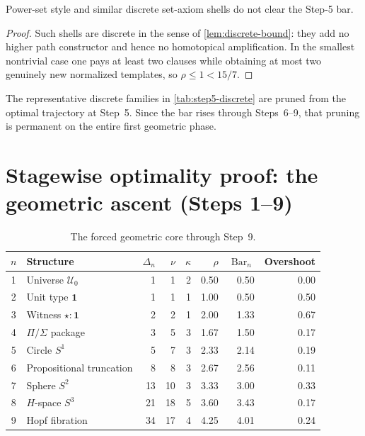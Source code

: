 \documentclass{lmcs}
\newcommand{\U}{\mathcal{U}}
\newcommand{\SelBar}{\operatorname{Bar}}
\begin{document}
\begin{lem}
\label{lem:set-fail}
Power-set style and similar discrete set-axiom shells do not clear the Step-5 bar.
\end{lem}

\begin{proof}
Such shells are discrete in the sense of \autoref{lem:discrete-bound}: they add no higher path constructor and hence no homotopical amplification. In the smallest nontrivial case one pays at least two clauses while obtaining at most two genuinely new normalized templates, so $\rho \leq 1 < 15/7$.
\end{proof}

\begin{cor}
\label{cor:local-pruning}
The representative discrete families in \autoref{tab:step5-discrete} are pruned from the optimal trajectory at Step~5. Since the bar rises through Steps~6--9, that pruning is permanent on the entire first geometric phase.
\end{cor}

\section{Stagewise optimality proof: the geometric ascent (Steps 1--9)}
\label{sec:stagewise}

\begin{table}[tbp]
\centering
\caption{The forced geometric core through Step~9.}
\label{tab:first-nine}
\small
\begin{tabular}{@{}clrrrrrr@{}}
\toprule
$n$ & Structure & $\Delta_n$ & $\nu$ & $\kappa$ & $\rho$ & $\SelBar_n$ & Overshoot \\
\midrule
1 & Universe $\U_0$ & 1 & 1 & 2 & 0.50 & 0.50 & 0.00 \\
2 & Unit type $\mathbf 1$ & 1 & 1 & 1 & 1.00 & 0.50 & 0.50 \\
3 & Witness $\star : \mathbf 1$ & 2 & 2 & 1 & 2.00 & 1.33 & 0.67 \\
4 & $\Pi/\Sigma$ package & 3 & 5 & 3 & 1.67 & 1.50 & 0.17 \\
5 & Circle $S^1$ & 5 & 7 & 3 & 2.33 & 2.14 & 0.19 \\
6 & Propositional truncation & 8 & 8 & 3 & 2.67 & 2.56 & 0.11 \\
7 & Sphere $S^2$ & 13 & 10 & 3 & 3.33 & 3.00 & 0.33 \\
8 & $H$-space $S^3$ & 21 & 18 & 5 & 3.60 & 3.43 & 0.17 \\
9 & Hopf fibration & 34 & 17 & 4 & 4.25 & 4.01 & 0.24 \\
\bottomrule
\end{tabular}
\end{table}
\end{document}
